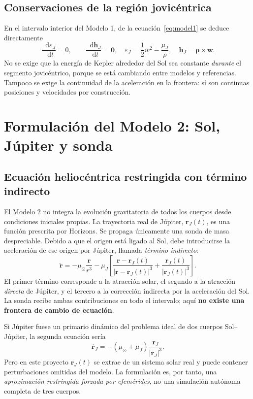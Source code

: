 \documentclass[11pt,a4paper]{article}
\newcommand{\vect}[1]{\bm{#1}}
\newcommand{\dif}{\mathop{}\!\mathrm{d}}
\newcommand{\muS}{\mu_\odot}
\newcommand{\muJ}{\mu_{J}}
\newcommand{\rJ}{\vect r_{J}}
\newcommand{\rV}{\vect r}
\begin{document}
\subsection{Conservaciones de la región jovicéntrica}
En el intervalo interior del Modelo 1, de la ecuación~\eqref{eq:model1} se deduce directamente
\begin{equation}\label{eq:inv1}
\boxed{\frac{\dif\varepsilon_J}{\dif t}=0,\qquad
\frac{\dif\vect h_J}{\dif t}=\vect0},
\quad
\varepsilon_J=\frac12 w^2-\frac{\muJ}{\rho},\quad
\vect h_J=\vect\rho\times\vect w.
\end{equation}
No se exige que la energía de Kepler alrededor del Sol sea constante \emph{durante} el segmento jovicéntrico, porque se está cambiando entre modelos y referencias. Tampoco se exige la continuidad de la aceleración en la frontera: sí son continuas posiciones y velocidades por construcción.

\section{Formulación del Modelo 2: Sol, Júpiter y sonda}
\subsection{Ecuación heliocéntrica restringida con término indirecto}
El Modelo 2 no integra la evolución gravitatoria de todos los cuerpos desde condiciones iniciales propias. La trayectoria real de Júpiter, $\rJ(t)$, es una función prescrita por Horizons. Se propaga únicamente una sonda de masa despreciable. Debido a que el origen está ligado al Sol, debe introducirse la aceleración de ese origen por Júpiter, llamada \emph{término indirecto}:
\begin{equation}\label{eq:model2}
\boxed{\ddot{\rV}=
-\muS\frac{\rV}{r^3}
-\muJ\left[
\frac{\rV-\rJ(t)}{|\rV-\rJ(t)|^3}
+\frac{\rJ(t)}{|\rJ(t)|^3}
\right].}
\end{equation}
El primer término corresponde a la atracción solar, el segundo a la atracción \emph{directa} de Júpiter, y el tercero a la corrección indirecta por la aceleración del Sol. La sonda recibe ambas contribuciones en todo el intervalo; aquí \textbf{no existe una frontera de cambio de ecuación}.

Si Júpiter fuese un primario dinámico del problema ideal de dos cuerpos Sol--Júpiter, la segunda ecuación sería
\begin{equation}
\ddot{\rJ}=-(\muS+\muJ)\frac{\rJ}{|\rJ|^3}.
\end{equation}
Pero en este proyecto $\rJ(t)$ se extrae de un sistema solar real y puede contener perturbaciones omitidas del modelo. La formulación es, por tanto, una \emph{aproximación restringida forzada por efemérides}, no una simulación autónoma completa de tres cuerpos.
\end{document}
